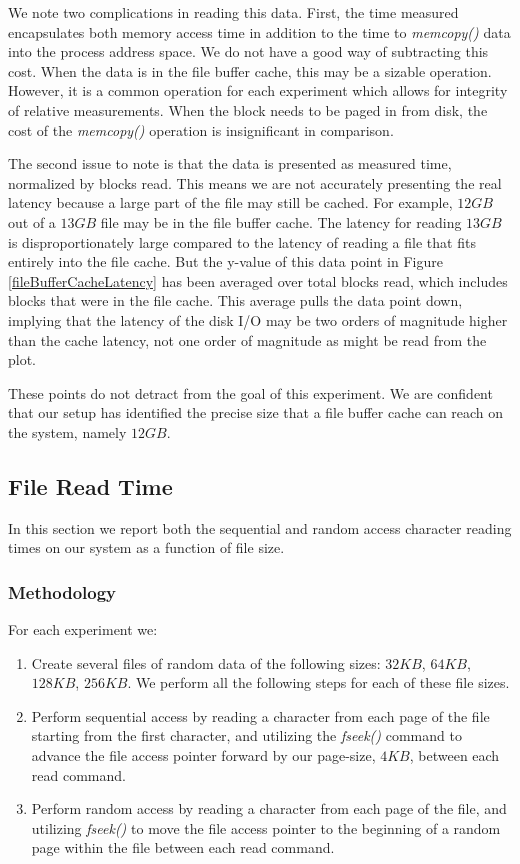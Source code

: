 \documentclass[sigconf]{acmart}
\begin{document}
We note two complications in reading this data. First, the time measured encapsulates both memory access time in addition to the time to \textit{memcopy()} data into the process address space. We do not have a good way of subtracting this cost. When the data is in the file buffer cache, this may be a sizable operation. However, it is a common operation for each experiment which allows for integrity of relative measurements. When the block needs to be paged in from disk, the cost of the \textit{memcopy()} operation is insignificant in comparison.

The second issue to note is that the data is presented as measured time, normalized by blocks read. This means we are not accurately presenting the real latency because a large part of the file may still be cached. For example, $12GB$ out of a $13GB$ file may be in the file buffer cache. The latency for reading $13GB$ is disproportionately large compared to the latency of reading a file that fits entirely into the file cache. But the y-value of this data point in Figure \ref{fileBufferCacheLatency} has been averaged over total blocks read, which includes blocks that were in the file cache. This average pulls the data point down, implying that the latency of the disk I/O may be two orders of magnitude higher than the cache latency, not one order of magnitude as might be read from the plot.

These points do not detract from the goal of this experiment. We are confident that our setup has identified the precise size that a file buffer cache can reach on the system, namely $12GB$.

\subsection{File Read Time}
In this section we report both the sequential and random access character reading times on our system as a function of file size.

\subsubsection{Methodology}
For each experiment we: 
\begin{enumerate}
\item Create several files of random data of the following sizes: $32KB$, $64KB$, $128KB$, $256KB$. We perform all the following steps for each of these file sizes.
\item Perform sequential access by reading a character from each page of the file starting from the first character, and utilizing the \textit{fseek()} command to advance the file access pointer forward by our page-size, $4KB$, between each read command.
\item Perform random access by reading a character from each page of the file, and utilizing \textit{fseek()} to  move the file access pointer to the beginning of a random page within the file between each read command.
\end{enumerate}
\end{document}
